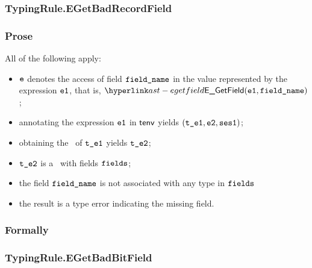 \subsubsection{TypingRule.EGetBadRecordField \label{sec:TypingRule.EGetBadRecordField}}
\subsubsection{Prose}
All of the following apply:
\begin{itemize}
  \item $\ve$ denotes the access of field $\fieldname$ in the value represented by the expression $\veone$, that is, $\EGetField(\veone, \fieldname)$;
  \item annotating the expression $\veone$ in $\tenv$ yields $(\vteone, \vetwo, \vsesone)$\ProseOrTypeError;
  \item obtaining the \underlyingtype\ of $\vteone$ yields $\vtetwo$\ProseOrTypeError;
  \item $\vtetwo$ is a \structuredtype\ with fields $\fields$;
  \item the field $\fieldname$ is not associated with any type in $\fields$
  \item the result is a type error indicating the missing field.
\end{itemize}
\subsubsection{Formally}
\begin{mathpar}
\end{mathpar}

\subsubsection{TypingRule.EGetBadBitField\label{sec:TypingRule.EGetBadBitField}}

